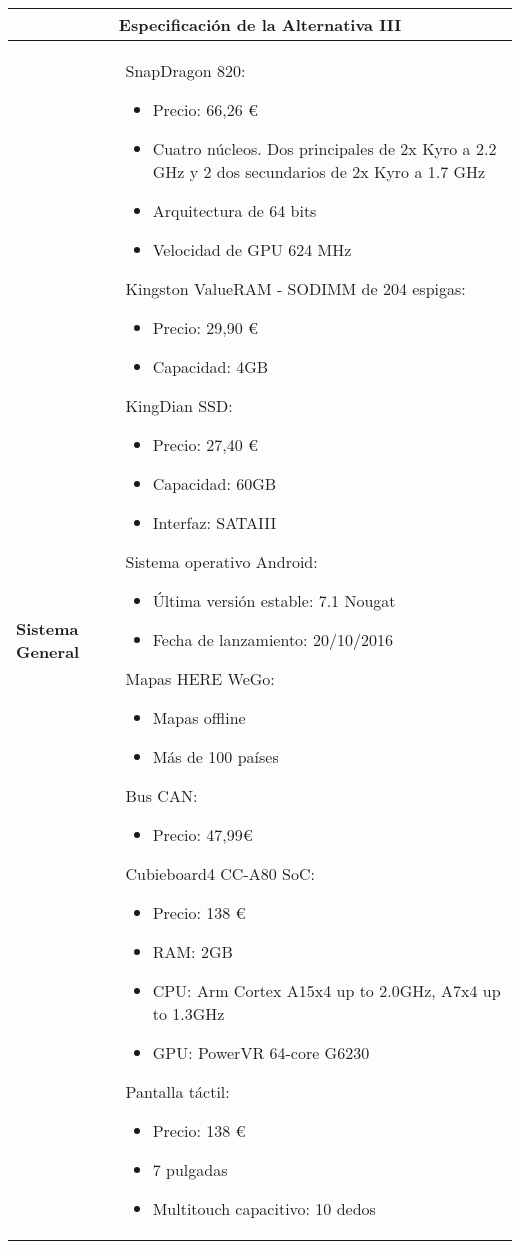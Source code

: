 \begin{table}[H]
\begin{center}
\begin{tabular}{p{5cm} p{8cm}}
\multicolumn{2}{c}{\textbf{Especificación de la Alternativa III} } \\
\hline \hline

\textbf{Sistema General} &
SnapDragon 820:
\begin{itemize}
    \item Precio: 66,26 \euro
    \item Cuatro núcleos. Dos principales de 2x Kyro a 2.2 GHz y 2 dos secundarios de 2x Kyro a 1.7 GHz
    \item Arquitectura de 64 bits
    \item Velocidad de GPU 624 MHz
\end{itemize}
Kingston ValueRAM - SODIMM de 204 espigas:
\begin{itemize}
    \item Precio: 29,90 \euro
    \item Capacidad: 4GB
\end{itemize}
KingDian SSD:
\begin{itemize}
    \item Precio: 27,40 \euro
    \item Capacidad: 60GB
    \item Interfaz: SATAIII
\end{itemize}
Sistema operativo Android:
\begin{itemize}
    \item Última versión estable: 7.1 Nougat
    \item Fecha de lanzamiento: 20/10/2016
\end{itemize}
Mapas HERE WeGo:
\begin{itemize}
    \item Mapas offline
    \item Más de 100 países
\end{itemize}
Bus CAN:
\begin{itemize}
    \item Precio: 47,99\euro
\end{itemize}
Cubieboard4 CC-A80 SoC:
\begin{itemize}
    \item Precio: 138 \euro
    \item RAM: 2GB
    \item CPU:  Arm Cortex A15x4 up to 2.0GHz, A7x4 up to 1.3GHz
    \item GPU:  PowerVR 64-core G6230
\end{itemize}
Pantalla táctil:
\begin{itemize}
    \item Precio: 138 \euro
    \item 7 pulgadas
    \item Multitouch capacitivo: 10 dedos
\end{itemize}
\\ \hline


\end{tabular}
\end{center}
\end{table}
